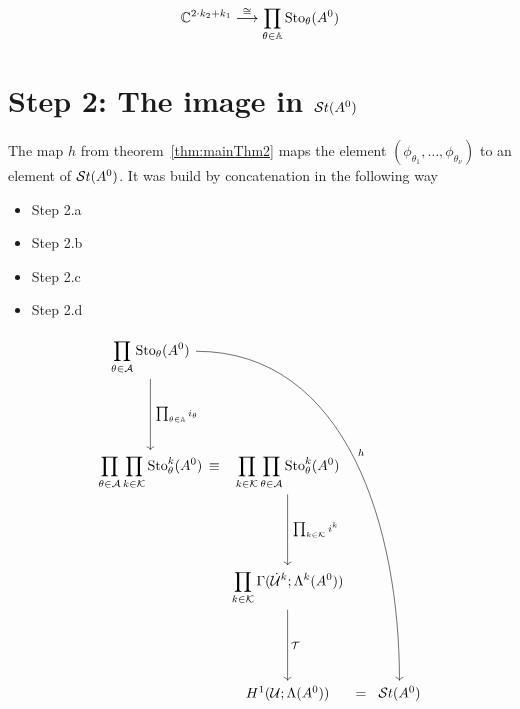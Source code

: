 \begin{prop}
  \TODO{}
  \[
    \mathbb{C}^{2\cdot k_2 + k_1}
    \overset\cong\longrightarrow
    \prod_{\theta\in\mathbb{A}}\operatorname{Sto}_\theta(A^0)
  \]
\end{prop}


\section{Step 2: The image in $\mathcal{S}{}t(A^0)$}
The map $h$ from theorem~\ref{thm:mainThm2} maps the element
$(\phi_{\theta_1},\dots,\phi_{\theta_\nu})$ to an element of $\mathcal{S}{}t(A^0)$.
It was build by concatenation in the following way
\bgroup
{}
\begin{paracol}{2}\sloppy
\switchcolumn[0]\noindent
  \vspace*{40mm}
  \begin{itemize}
    \item[] Step 2.a 
    \item[] Step 2.b 
    \item[] Step 2.c 
    \item[] Step 2.d 
  \end{itemize}
\switchcolumn[1]\noindent
  \[ \begin{tikzcd}[column sep=0,row sep=1.8cm]
      \displaystyle \prod_{\theta\in\cA}\Sto_\theta(A^0)
      \dar{\tikzmark{e1}\prod_{\theta\in\A}i_\theta}
      \arrow[dddrrrr, out=0,in=90,"h"]
    \\\displaystyle \prod_{\theta\in\cA}\prod_{k\in\cK}\Sto_\theta^k(A^0)
    &\tikzmark{e2}\!\!\!\!\equiv
    &\displaystyle \prod_{k\in\cK}\prod_{\theta\in\cA}\Sto_\theta^k(A^0)
      \dar{\tikzmark{e3}\prod_{k\in\cK}i^k}
    \\&&\displaystyle \prod_{k\in\cK}\Gamma(\dot\cU^k;\Lambda^k(A^0))
      \dar{\tikzmark{e4}\cT}
    \\&&H^1(\cU;\Lambda(A^0))&=&\St(A^0)
  \end{tikzcd} \]
\end{paracol}
\egroup

